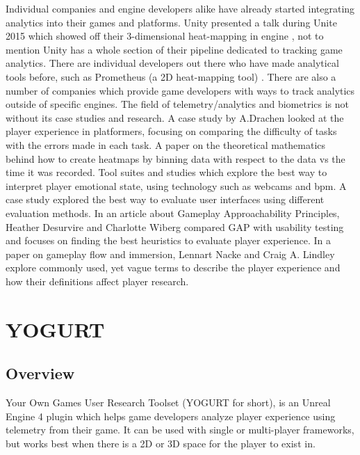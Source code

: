 \documentclass[journal]{IEEEtran}
\begin{document}
Individual companies and engine developers alike have already started integrating analytics into their games and platforms. Unity presented a talk during Unite 2015 which showed off their 3-dimensional heat-mapping in engine \cite{unite2015}, not to mention Unity has a whole section of their pipeline dedicated to tracking game analytics. There are individual developers out there who have made analytical tools before, such as Prometheus (a 2D heat-mapping tool) \cite{gibbs}. There are also a number of companies which provide game developers with ways to track analytics outside of specific engines. \cite{simpleusability} \cite{drachen} The field of telemetry/analytics and biometrics is not without its case studies and research. A case study by A.Drachen looked at the player experience in platformers, focusing on comparing the difficulty of tasks with the errors made in each task. \cite{wehbe} A paper on the theoretical mathematics behind how to create heatmaps by binning data with respect to the data vs the time it was recorded. \cite{kumatani} Tool suites and studies which explore the best way to interpret player emotional state, using technology such as webcams and bpm. \cite{dingli} A case study explored the best way to evaluate user interfaces using different evaluation methods. \cite{nielsen} In an article about Gameplay Approachability Principles, Heather Desurvire and Charlotte Wiberg compared GAP with usability testing and focuses on finding the best heuristics to evaluate player experience. \cite{desurvire} In a paper on gameplay flow and immersion, Lennart Nacke and Craig A. Lindley explore commonly used, yet vague terms to describe the player experience and how their definitions affect player research. \cite{nacke}


\section{YOGURT}


\subsection{Overview}

Your Own Games User Research Toolset (YOGURT for short), is an Unreal Engine 4 plugin which helps game developers analyze player experience using telemetry from their game. It can be used with single or multi-player frameworks, but works best when there is a 2D or 3D space for the player to exist in.
\end{document}
